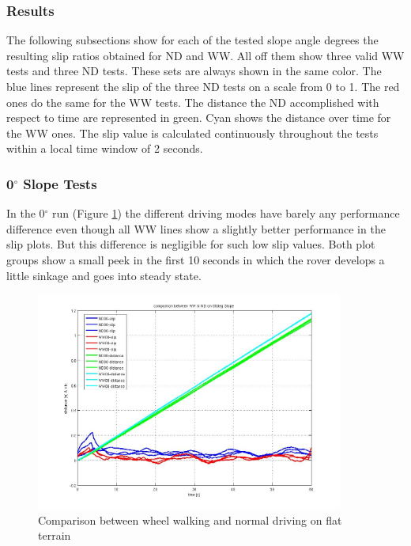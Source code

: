 \documentclass[a4paper,twocolumn]{esapub2005} %
\begin{document}
\subsubsection{Results} 
The following subsections show for each of the tested slope angle degrees the
resulting slip ratios obtained for ND and WW. All off them show three valid WW
tests and three ND tests. These sets are always shown in the same color. The
blue lines represent the slip of the three ND tests on a scale from 0 to 1. The
red ones do the same for the WW tests. The distance the ND accomplished with
respect to time are represented in green. Cyan shows the distance over time for
the WW ones. The slip value is calculated continuously throughout the tests
within a local time window of 2 seconds.

\subsubsection*{0$^{\circ}$ Slope Tests}
In the 0$^\circ$ run (Figure \ref{fig:00d}) the different driving modes have
barely any performance difference even though all WW lines show a slightly
better performance in the slip plots. But this difference is negligible for
such low slip values. Both plot groups show a small peek in the first 10
seconds in which the rover develops a little sinkage and goes into steady
state. 

\begin{figure}[b!]
    \centering
    \includegraphics[width=0.9\textwidth]{00d.jpg}
    \caption{Comparison between wheel walking and normal driving on flat terrain}
    \label{fig:00d}
\end{figure}
\end{document}
